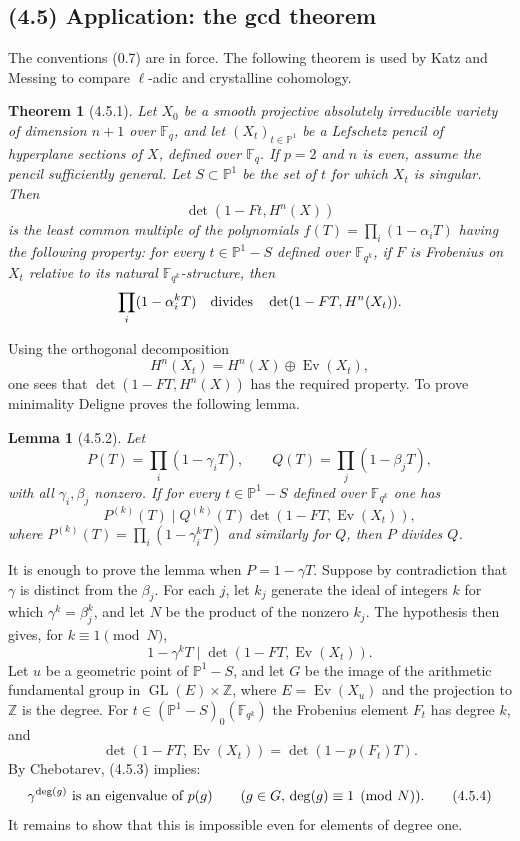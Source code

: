 \documentclass[11pt]{article}
\newtheorem{theorem}{Theorem}
\newtheorem{lemma}{Lemma}
\theoremstyle{remark}
\begin{document}
\subsection*{(4.5) Application: the gcd theorem}

The conventions (0.7) are in force. The following theorem is used by Katz and Messing to compare $\ell$-adic and crystalline cohomology.

\begin{theorem}[4.5.1]
Let $X_0$ be a smooth projective absolutely irreducible variety of dimension $n+1$ over $\mathbb F_q$, and let $(X_t)_{t\in\mathbb P^1}$ be a Lefschetz pencil of hyperplane sections of $X$, defined over $\mathbb F_q$. If $p=2$ and $n$ is even, assume the pencil sufficiently general. Let $S\subset\mathbb P^1$ be the set of $t$ for which $X_t$ is singular. Then
\[
\det(1-Ft,H^n(X))
\]
is the least common multiple of the polynomials $f(T)=\prod_i(1-\alpha_iT)$ having the following property: for every $t\in\mathbb P^1-S$ defined over $\mathbb F_{q^k}$, if $F$ is Frobenius on $X_t$ relative to its natural $\mathbb F_{q^k}$-structure, then
\[
\prod_i(1-\alpha_i^kT)\quad\hbox{divides}\quad
\det(1-FT,H^n(X_t)).
\]
\end{theorem}

Using the orthogonal decomposition
\[
H^n(X_t)=H^n(X)\oplus \operatorname{Ev}(X_t),
\]
one sees that $\det(1-FT,H^n(X))$ has the required property. To prove minimality Deligne proves the following lemma.

\begin{lemma}[4.5.2]
Let
\[
P(T)=\prod_i(1-\gamma_iT),
\qquad
Q(T)=\prod_j(1-\beta_jT),
\]
with all $\gamma_i,\beta_j$ nonzero. If for every $t\in\mathbb P^1-S$ defined over $\mathbb F_{q^k}$ one has
\[
P^{(k)}(T)\mid Q^{(k)}(T)\det(1-FT,\operatorname{Ev}(X_t)),
\]
where $P^{(k)}(T)=\prod_i(1-\gamma_i^kT)$ and similarly for $Q$, then $P$ divides $Q$.
\end{lemma}

It is enough to prove the lemma when $P=1-\gamma T$. Suppose by contradiction that $\gamma$ is distinct from the $\beta_j$. For each $j$, let $k_j$ generate the ideal of integers $k$ for which $\gamma^k=\beta_j^k$, and let $N$ be the product of the nonzero $k_j$. The hypothesis then gives, for $k\equiv1\pmod N$,
\[
1-\gamma^kT\mid \det(1-FT,\operatorname{Ev}(X_t)).
\tag{4.5.3}
\]
Let $u$ be a geometric point of $\mathbb P^1-S$, and let $G$ be the image of the arithmetic fundamental group in $\operatorname{GL}(E)\times\mathbb Z$, where $E=\operatorname{Ev}(X_u)$ and the projection to $\mathbb Z$ is the degree. For $t\in(\mathbb P^1-S)_0(\mathbb F_{q^k})$ the Frobenius element $F_t$ has degree $k$, and
\[
\det(1-FT,
\operatorname{Ev}(X_t))=\det(1-p(F_t)T).
\]
By Chebotarev, (4.5.3) implies:
\[
\gamma^{\deg(g)}\hbox{ is an eigenvalue of }p(g)
\qquad (g\in G,\\ \deg(g)\equiv1\pmod N).
\tag{4.5.4}
\]
It remains to show that this is impossible even for elements of degree one.
\end{document}
